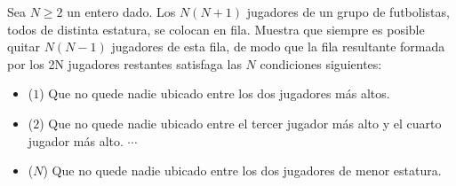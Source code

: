 Sea $N \ge 2$ un entero dado. Los $N(N + 1)$ jugadores de un grupo de futbolistas, todos de distinta estatura, se colocan en fila. Muestra que siempre es posible quitar $N(N - 1)$ jugadores de esta fila, de modo que la fila resultante formada por los 2N jugadores restantes satisfaga las $N$ condiciones siguientes: 
\begin{itemize}
\item ($1$) Que no quede nadie ubicado entre los dos jugadores más altos. 
\item ($2$) Que no quede nadie ubicado entre el tercer jugador más alto y el cuarto jugador más alto. $\cdots$
\item ($N$) Que no quede nadie ubicado entre los dos jugadores de menor estatura. 
\end{itemize}